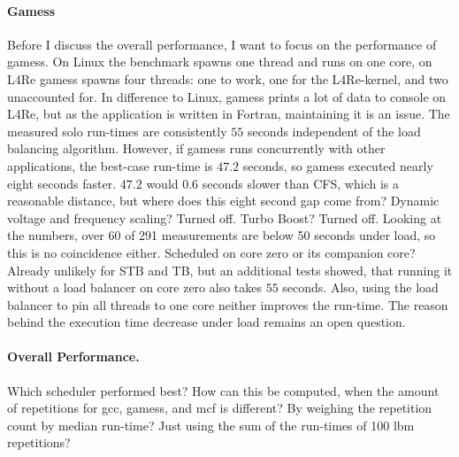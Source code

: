\paragraph{Gamess}
Before I discuss the overall performance, I want to focus on the performance of
gamess.
On Linux the benchmark spawns one thread and runs on one core, on L4Re gamess
spawns four threads: one to work, one for the L4Re-kernel, and two unaccounted
for.
In difference to Linux, gamess prints a lot of data to console on L4Re, but as
the application is written in Fortran, maintaining it is an issue.
The measured solo run-times are consistently $55$ seconds independent of the
load balancing algorithm.
However, if gamess runs concurrently with other applications, the best-case
run-time is $47.2$ seconds, so gamess executed nearly eight seconds faster.
$47.2$ would $0.6$ seconds slower than CFS, which is a reasonable distance, but
where does this eight second gap come from?
Dynamic voltage and frequency scaling? Turned off.
Turbo Boost? Turned off.
Looking at the numbers, over 60 of 291 measurements are below 50 seconds under
load, so this is no coincidence either.
Scheduled on core zero or its companion core? Already unlikely for STB and TB,
but an additional tests showed, that running it without a load balancer on core
zero also takes $55$ seconds.
Also, using the load balancer to pin all threads to one core neither improves
the run-time.
The reason behind the execution time decrease under load remains an open
question.

\paragraph{Overall Performance.}
Which scheduler performed best?
How can this be computed, when the amount of repetitions for gcc, gamess, and
mcf is different?
By weighing the repetition count by  median run-time?
Just using the sum of the run-times of 100 lbm repetitions?
